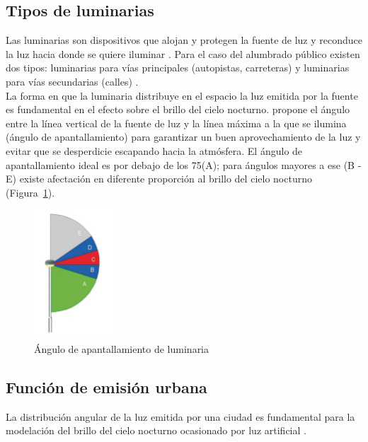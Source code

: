 \newpage

\subsection{Tipos de luminarias}

Las luminarias son dispositivos que alojan y protegen la fuente de luz y reconduce la luz hacia donde se quiere iluminar \citep{LibroCL}. Para el caso del alumbrado público existen dos tipos: luminarias para vías principales (autopistas, carreteras) y luminarias para vías secundarias (calles) \citep{INFO2019}.\\

La forma en que la luminaria distribuye en el espacio la luz emitida por la fuente es fundamental en el efecto sobre el brillo del cielo nocturno. \cite{Marin2009} propone el ángulo entre la línea vertical de la fuente de luz y la línea máxima a la que se ilumina (ángulo de apantallamiento) para garantizar un buen aprovechamiento de la luz y evitar que se desperdicie escapando hacia la atmósfera. El ángulo de apantallamiento ideal es por debajo de los 75\grad (A); para ángulos mayores a ese (B - E) existe afectación en diferente proporción al brillo del cielo nocturno (Figura~\ref{anguloapantallamiento}).


\begin{figure}[htb]
  \centering
    \includegraphics[width=30mm, scale=0.3]{anguloapantallamiento}
  \caption{Ángulo de apantallamiento de luminaria \citep{Marin2009}}
  \label{anguloapantallamiento}
\end{figure}


\subsection{Función de emisión urbana}

La distribución angular de la luz emitida por una ciudad es fundamental para la modelación del brillo del cielo nocturno ocasionado por luz artificial \citep{Kocifaj2014}.\\

